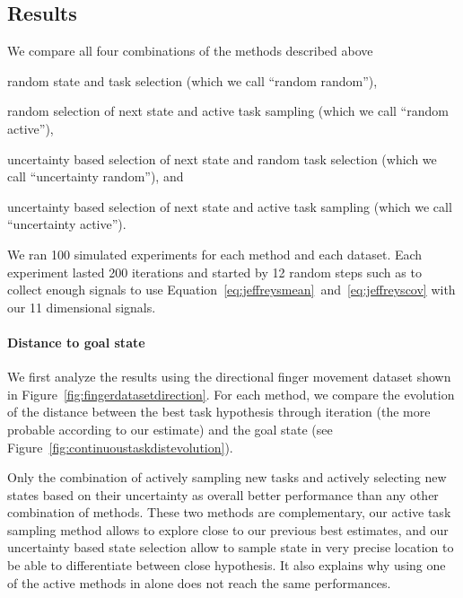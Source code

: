 \subsection{Results}

We compare all four combinations of the methods described above \begin{inparaenum}[a)] \item random state and task selection (which we call ``random random''), \item random selection of next state and active task sampling (which we call ``random active''), \item uncertainty based selection of next state and random task selection (which we call ``uncertainty random''), and \item uncertainty based selection of next state and active task sampling (which we call ``uncertainty active''). \end{inparaenum}

We ran 100 simulated experiments for each method and each dataset. Each experiment lasted 200 iterations and started by 12 random steps such as to collect enough signals to use Equation~\ref{eq:jeffreysmean}~and~\ref{eq:jeffreyscov} with our 11 dimensional signals.

\paragraph{Distance to goal state}

We first analyze the results using the directional finger movement dataset shown in Figure~\ref{fig:fingerdatasetdirection}. For each method, we compare the evolution of the distance between the best task hypothesis through iteration (the more probable according to our estimate) and the goal state (see Figure~\ref{fig:continuoustaskdistevolution}).

Only the combination of actively sampling new tasks and actively selecting new states based on their uncertainty as overall better performance than any other combination of methods. These two methods are complementary, our active task sampling method allows to explore close to our previous best estimates, and our uncertainty based state selection allow to sample state in very precise location to be able to differentiate between close hypothesis. It also explains why using one of the active methods in alone does not reach the same performances.

